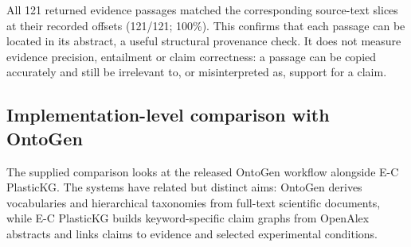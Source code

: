 \documentclass[11pt,a4paper]{article}
\begin{document}
All 121 returned evidence passages matched the corresponding source-text slices at their recorded offsets (121/121; 100\%). This confirms that each passage can be located in its abstract, a useful structural provenance check. It does not measure evidence precision, entailment or claim correctness: a passage can be copied accurately and still be irrelevant to, or misinterpreted as, support for a claim.

\subsection{Implementation-level comparison with OntoGen}

The supplied comparison looks at the released OntoGen workflow alongside E-C PlasticKG. The systems have related but distinct aims: OntoGen derives vocabularies and hierarchical taxonomies from full-text scientific documents, while E-C PlasticKG builds keyword-specific claim graphs from OpenAlex abstracts and links claims to evidence and selected experimental conditions.
\end{document}
